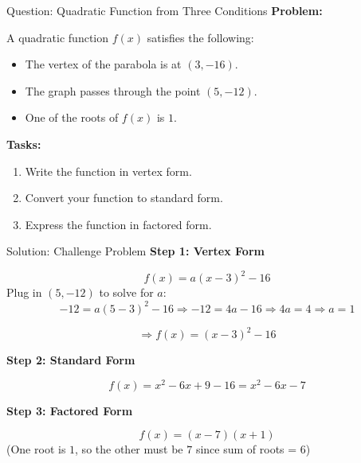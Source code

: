\documentclass{beamer}
\begin{document}
\begin{frame}{Question: Quadratic Function from Three Conditions}
\small
\textbf{Problem:}

A quadratic function $f(x)$ satisfies the following:

\begin{itemize}
    \item The vertex of the parabola is at $(3, -16)$.
    \item The graph passes through the point $(5, -12)$.
    \item One of the roots of $f(x)$ is $1$.
\end{itemize}

\vspace{0.3cm}
\textbf{Tasks:}
\begin{enumerate}
    \item Write the function in vertex form.
    \item Convert your function to standard form.
    \item Express the function in factored form.
\end{enumerate}
\end{frame}

\begin{frame}{Solution: Challenge Problem}
\small
\textbf{Step 1: Vertex Form}

\[
f(x) = a(x - 3)^2 - 16
\]
Plug in $(5, -12)$ to solve for $a$:
\[
-12 = a(5 - 3)^2 - 16 \Rightarrow -12 = 4a - 16 \Rightarrow 4a = 4 \Rightarrow a = 1
\]

\[
\Rightarrow f(x) = (x - 3)^2 - 16
\]

\vspace{0.3cm}
\textbf{Step 2: Standard Form}

\[
f(x) = x^2 - 6x + 9 - 16 = x^2 - 6x - 7
\]

\vspace{0.3cm}
\textbf{Step 3: Factored Form}

\[
f(x) = (x - 7)(x + 1)
\]
(One root is $1$, so the other must be $7$ since sum of roots = $6$)

\end{frame}
\end{document}
